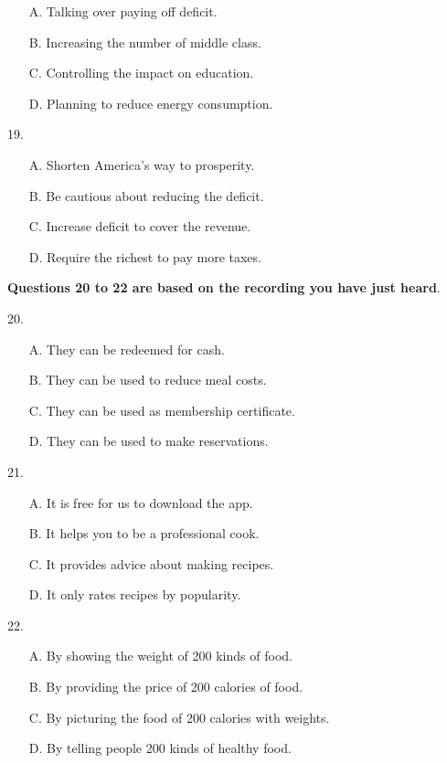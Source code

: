 \documentclass[UTF8,11pt]{ctexart}
\begin{document}
\begin{itemize}[leftmargin=2em,itemsep=.2em,topsep=.4em]\item[A.] Talking over paying off deficit.
\item[B.] Increasing the number of middle class.
\item[C.] Controlling the impact on education.
\item[D.] Planning to reduce energy consumption.
\end{itemize}

19.


\begin{itemize}[leftmargin=2em,itemsep=.2em,topsep=.4em]\item[A.] Shorten America's way to prosperity.
\item[B.] Be cautious about reducing the deficit.
\item[C.] Increase deficit to cover the revenue.
\item[D.] Require the richest to pay more taxes.
\end{itemize}

\textbf{Questions 20 to 22 are based on the recording you have just heard}.


20.


\begin{itemize}[leftmargin=2em,itemsep=.2em,topsep=.4em]\item[A.] They can be redeemed for cash.
\item[B.] They can be used to reduce meal costs.
\item[C.] They can be used as membership certificate.
\item[D.] They can be used to make reservations.
\end{itemize}

21.


\begin{itemize}[leftmargin=2em,itemsep=.2em,topsep=.4em]\item[A.] It is free for us to download the app.
\item[B.] It helps you to be a professional cook.
\item[C.] It provides advice about making recipes.
\item[D.] It only rates recipes by popularity.
\end{itemize}

22.


\begin{itemize}[leftmargin=2em,itemsep=.2em,topsep=.4em]\item[A.] By showing the weight of 200 kinds of food.
\item[B.] By providing the price of 200 calories of food.
\item[C.] By picturing the food of 200 calories with weights.
\item[D.] By telling people 200 kinds of healthy food.
\end{itemize}
\end{document}
